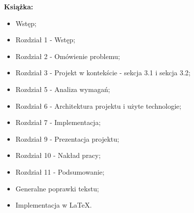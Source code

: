 \textbf{Książka:}

\begin{itemize}
    \item Wstęp;
    \item Rozdział 1 - Wstęp;
    \item Rozdział 2 - Omówienie problemu;
    \item Rozdział 3 - Projekt w kontekście - sekcja 3.1 i sekcja 3.2;
    \item Rozdział 5 - Analiza wymagań;
    \item Rozdział 6 - Architektura projektu i użyte technologie;
    \item Rozdział 7 - Implementacja;
    \item Rozdział 9 - Prezentacja projektu;
    \item Rozdział 10 - Nakład pracy;
    \item Rozdział 11 - Podsumowanie;
    \item Generalne poprawki tekstu;
    \item Implementacja w LaTeX.
\end{itemize}


